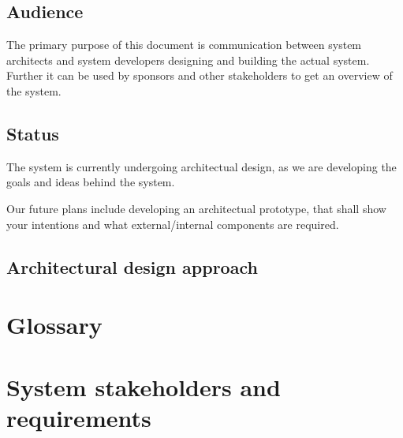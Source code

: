 \documentclass[a4paper,11pt]{report}
\begin{document}
\section{Audience}
\label{sec:audience}
The primary purpose of this document is communication between system architects
and system developers designing and building the actual system.
Further it can be used by sponsors and other stakeholders to get an overview of
the system.

\section{Status}
\label{sec:status}
The system is currently undergoing architectual design, as we are developing
the goals and ideas behind the system.

Our future plans include developing an architectual prototype, that shall show
your intentions and what external/internal components are required.

\section{Architectural design approach}
\label{sec:arch-design-appr}


\chapter{Glossary}
\label{cha:glossary}
\thispagestyle{fancy}

\chapter{System stakeholders and requirements}
\label{cha:syst-stak-requ}
\thispagestyle{fancy}
\end{document}
